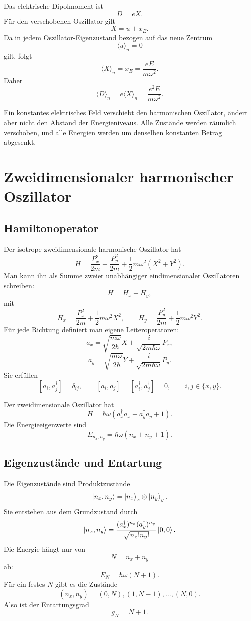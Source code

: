 Das elektrische Dipolmoment ist
\[
    D=eX.
\]
Für den verschobenen Oszillator gilt
\[
    X=u+x_E.
\]
Da in jedem Oszillator-Eigenzustand bezogen auf das neue Zentrum
\[
    \langle u\rangle_n=0
\]
gilt, folgt
\[
    \langle X\rangle_n=x_E=\frac{eE}{m\omega^2}.
\]
Daher
\[
    \langle D\rangle_n=e\langle X\rangle_n=\frac{e^2E}{m\omega^2}.
\]

\begin{conceptbox}
Ein konstantes elektrisches Feld verschiebt den harmonischen Oszillator, ändert aber nicht den Abstand der Energieniveaus. Alle Zustände werden räumlich verschoben, und alle Energien werden um denselben konstanten Betrag abgesenkt.
\end{conceptbox}

\section{Zweidimensionaler harmonischer Oszillator}

\subsection{Hamiltonoperator}

Der isotrope zweidimensionale harmonische Oszillator hat
\[
    H=\frac{P_x^2}{2m}+\frac{P_y^2}{2m}
    +\frac12m\omega^2(X^2+Y^2).
\]
Man kann ihn als Summe zweier unabhängiger eindimensionaler Oszillatoren schreiben:
\[
    H=H_x+H_y,
\]
mit
\[
    H_x=\frac{P_x^2}{2m}+\frac12m\omega^2X^2,
    \qquad
    H_y=\frac{P_y^2}{2m}+\frac12m\omega^2Y^2.
\]
Für jede Richtung definiert man eigene Leiteroperatoren:
\[
    a_x=\sqrt{\frac{m\omega}{2\hbar}}X+\frac{i}{\sqrt{2m\hbar\omega}}P_x,
\]
\[
    a_y=\sqrt{\frac{m\omega}{2\hbar}}Y+\frac{i}{\sqrt{2m\hbar\omega}}P_y.
\]
Sie erfüllen
\[
    [a_i,a_j^\dagger]=\delta_{ij},
    \qquad
    [a_i,a_j]=[a_i^\dagger,a_j^\dagger]=0,
    \qquad i,j\in\{x,y\}.
\]

\begin{formulabox}
Der zweidimensionale Oszillator hat
\[
    H=\hbar\omega\left(a_x^\dagger a_x+a_y^\dagger a_y+1\right).
\]
Die Energieeigenwerte sind
\[
    E_{n_x,n_y}=\hbar\omega(n_x+n_y+1).
\]
\end{formulabox}

\subsection{Eigenzustände und Entartung}

Die Eigenzustände sind Produktzustände
\[
    \left|n_x,n_y\right\rangle=\left|n_x\right\rangle_x\otimes\left|n_y\right\rangle_y.
\]
Sie entstehen aus dem Grundzustand durch
\[
    \left|n_x,n_y\right\rangle=\frac{(a_x^\dagger)^{n_x}(a_y^\dagger)^{n_y}}{\sqrt{n_x!n_y!}}\left|0,0\right\rangle.
\]
Die Energie hängt nur von
\[
    N=n_x+n_y
\]
ab:
\[
    E_N=\hbar\omega(N+1).
\]
Für ein festes $N$ gibt es die Zustände
\[
    (n_x,n_y)=(0,N),(1,N-1),\dots,(N,0).
\]
Also ist der Entartungsgrad
\[
    g_N=N+1.
\]

